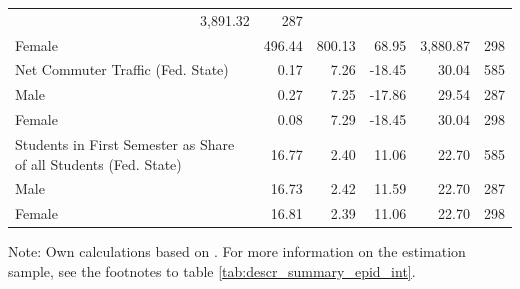 \documentclass[a4paper, oneside, hyperfootnotes = false]{article}
\begin{document}
{\begin{table}[ht]
\begin{center}
{\begin{tabular}{llllll}
			\multicolumn{1}{r}{3,891.32} &
			\multicolumn{1}{r}{287} \\
			\multicolumn{1}{l}{\hspace{1em}Female} &
			\multicolumn{1}{r}{496.44} &
			\multicolumn{1}{r}{800.13} &
			\multicolumn{1}{r}{68.95} &
			\multicolumn{1}{r}{3,880.87} &
			\multicolumn{1}{r}{298} \\
			\multicolumn{1}{l}{Net Commuter Traffic (Fed. State)} &
			\multicolumn{1}{r}{0.17} &
			\multicolumn{1}{r}{7.26} &
			\multicolumn{1}{r}{-18.45} &
			\multicolumn{1}{r}{30.04} &
			\multicolumn{1}{r}{585} \\
			\multicolumn{1}{l}{\hspace{1em}Male} &
			\multicolumn{1}{r}{0.27} &
			\multicolumn{1}{r}{7.25} &
			\multicolumn{1}{r}{-17.86} &
			\multicolumn{1}{r}{29.54} &
			\multicolumn{1}{r}{287} \\
			\multicolumn{1}{l}{\hspace{1em}Female} &
			\multicolumn{1}{r}{0.08} &
			\multicolumn{1}{r}{7.29} &
			\multicolumn{1}{r}{-18.45} &
			\multicolumn{1}{r}{30.04} &
			\multicolumn{1}{r}{298} \\
			\multicolumn{1}{l}{Students in First Semester as Share of all Students (Fed. State)} &
			\multicolumn{1}{r}{16.77} &
			\multicolumn{1}{r}{2.40} &
			\multicolumn{1}{r}{11.06} &
			\multicolumn{1}{r}{22.70} &
			\multicolumn{1}{r}{585} \\
			\multicolumn{1}{l}{\hspace{1em}Male} &
			\multicolumn{1}{r}{16.73} &
			\multicolumn{1}{r}{2.42} &
			\multicolumn{1}{r}{11.59} &
			\multicolumn{1}{r}{22.70} &
			\multicolumn{1}{r}{287} \\
			\multicolumn{1}{l}{\hspace{1em}Female} &
			\multicolumn{1}{r}{16.81} &
			\multicolumn{1}{r}{2.39} &
			\multicolumn{1}{r}{11.06} &
			\multicolumn{1}{r}{22.70} &
			\multicolumn{1}{r}{298} \\
			\bottomrule
	\end{tabular}}

	\vspace{2mm}
	
	\parbox{15cm}{
		\linespread{1}\footnotesize Note: Own calculations based on \cite{SOEP2023}. For more information on the estimation sample, see the footnotes to table \ref{tab:descr_summary_epid_int}.}
	
\end{center}
\end{table}

}
\end{document}
